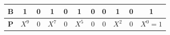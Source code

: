\begin{tabular}{c*{10}{c}}\toprule
$\mathbf{B}$ & 1 & 0 & 1 & 0 & 1 & 0 & 0 & 1 & 0 & 1\\\midrule
$\mathbf{P}$ & $X^9$ & 0 & $X^7$ & 0 & $X^5$ & 0 & 0 & $X^2$ & 0 & $X^0{=}1$\\\bottomrule\end{tabular}
